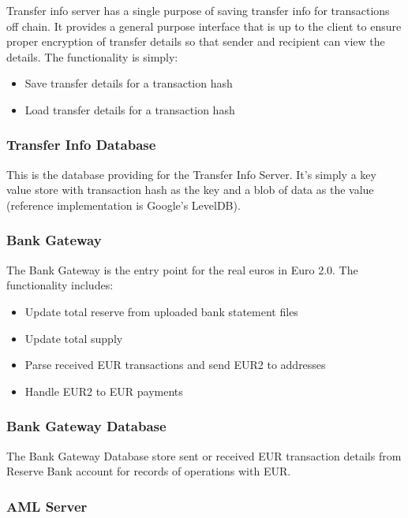 \documentclass[a4paper,12pt]{article} %
\begin{document}
{Transfer info server has a single purpose of saving transfer info for transactions off chain. It provides a general purpose interface that is up to the client to ensure proper encryption of transfer details so that sender and recipient can view the details. The functionality is simply:

\begin{itemize}
	\item Save transfer details for a transaction hash
	\item Load transfer details for a transaction hash
\end{itemize}

\subsubsection{Transfer Info Database} \label{sssec:3.5:transferInfoDatabase}

This is the database providing for the Transfer Info Server. It's simply a key value store with transaction hash as the key and a blob of data as the value (reference implementation is Google's LevelDB).

\subsubsection{Bank Gateway} \label{sssec:3.5:bankGateway}

The Bank Gateway is the entry point for the real euros in Euro 2.0. The functionality includes:

\begin{itemize}
	\item Update total reserve from uploaded bank statement files
	\item Update total supply
	\item Parse received EUR transactions and send EUR2 to addresses
	\item Handle EUR2 to EUR payments
\end{itemize}

\subsubsection{Bank Gateway Database} \label{sssec:3.5:bankGatewayDb}

The Bank Gateway Database store sent or received EUR transaction details from Reserve Bank account for records of operations with EUR.

\subsubsection{AML Server} \label{sssec:3.5:amlServer}

}
\end{document}
